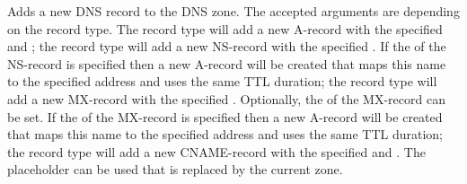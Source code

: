 Adds a new DNS record to the DNS zone. 
The accepted arguments are depending on
the record type. The  record type will add a new A-record with the 
specified  and ; 
the  record type will add a 
new NS-record with the specified . If 
the  of the NS-record is specified then a new A-record will be 
created that maps this name to the specified address and uses the 
same TTL duration;
the  record type will add a 
new MX-record with the specified . Optionally, the 
of the MX-record can be set. If the  of the MX-record is 
specified then a new A-record will be created that maps this name to the 
specified address and uses the same TTL duration;
the  record type will add
a new CNAME-record with the specified  and .
The placeholder \qcode{\%} can be used that is replaced by the current zone.
